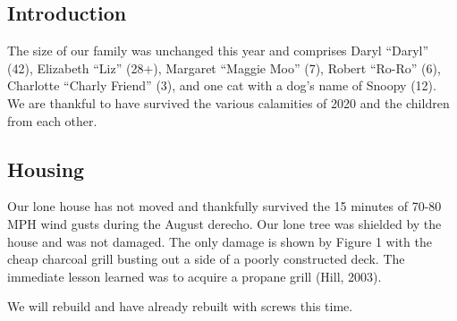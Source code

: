 \documentclass[letterpaper,11pt]{article}
\makeatletter
\newenvironment{figurehere}
  {\def\@captype{figure}}
  {}
\makeatother
\begin{document}
\begin{multicols}{2}

\section{Introduction} 

The size of our family was unchanged this year and comprises Daryl
\enquote{Daryl} (42), Elizabeth \enquote{Liz} (28+),
Margaret \enquote{Maggie Moo} (7), Robert \enquote{Ro-Ro} (6), Charlotte
 \enquote{Charly Friend} (3), and one cat with a dog's name of Snoopy (12). 
We are thankful to have survived the various calamities of 2020 and the
children from each other.
   
\subsection{Housing}

Our lone house has not moved and thankfully survived the 15 minutes of 70-80 MPH
wind gusts during the August derecho.  Our lone tree was shielded by the house
and was not damaged. The only damage is shown by Figure 1 with
the cheap charcoal grill busting out a side of a poorly constructed deck.
The immediate lesson learned was to acquire a propane grill (Hill, 2003).

\bigskip

\begin{figurehere}
    \centering   
    \caption{We will rebuild and have already rebuilt with screws this time.}
\end{figurehere}


\end{multicols}
\end{document}
